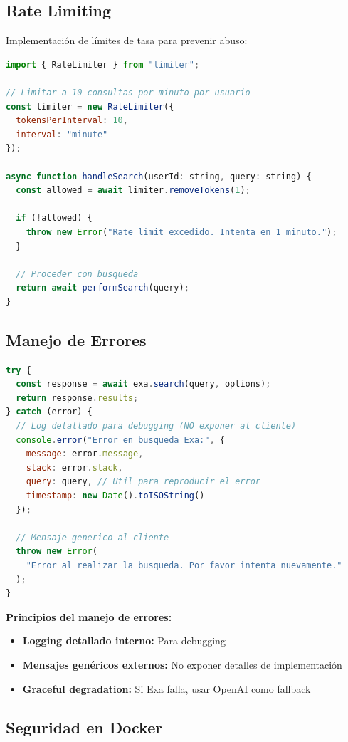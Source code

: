 \documentclass[12pt,a4paper]{article}
\begin{document}
\subsection{Rate Limiting}

Implementación de límites de tasa para prevenir abuso:

\begin{lstlisting}[language=JavaScript]
import { RateLimiter } from "limiter";

// Limitar a 10 consultas por minuto por usuario
const limiter = new RateLimiter({
  tokensPerInterval: 10,
  interval: "minute"
});

async function handleSearch(userId: string, query: string) {
  const allowed = await limiter.removeTokens(1);

  if (!allowed) {
    throw new Error("Rate limit excedido. Intenta en 1 minuto.");
  }

  // Proceder con busqueda
  return await performSearch(query);
}
\end{lstlisting}

\subsection{Manejo de Errores}

\begin{lstlisting}[language=JavaScript]
try {
  const response = await exa.search(query, options);
  return response.results;
} catch (error) {
  // Log detallado para debugging (NO exponer al cliente)
  console.error("Error en busqueda Exa:", {
    message: error.message,
    stack: error.stack,
    query: query, // Util para reproducir el error
    timestamp: new Date().toISOString()
  });

  // Mensaje generico al cliente
  throw new Error(
    "Error al realizar la busqueda. Por favor intenta nuevamente."
  );
}
\end{lstlisting}

\textbf{Principios del manejo de errores:}
\begin{itemize}
    \item \textbf{Logging detallado interno:} Para debugging
    \item \textbf{Mensajes genéricos externos:} No exponer detalles de implementación
    \item \textbf{Graceful degradation:} Si Exa falla, usar OpenAI como fallback
\end{itemize}

\subsection{Seguridad en Docker}
\end{document}
